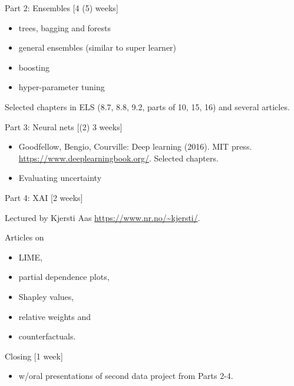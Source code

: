 \documentclass[
  ignorenonframetext,
]{beamer}
\providecommand{\tightlist}{%
  \setlength{\itemsep}{0pt}\setlength{\parskip}{0pt}}
\begin{document}
\begin{frame}

\begin{block}{Part 2: Ensembles {[}4 (5) weeks{]}}

\begin{itemize}
\tightlist
\item
  trees, bagging and forests
\item
  general ensembles (similar to super learner)
\item
  boosting
\item
  hyper-parameter tuning
\end{itemize}

Selected chapters in ELS (8.7, 8.8, 9.2, parts of 10, 15, 16) and
several articles.

\end{block}

\begin{block}{Part 3: Neural nets {[}(2) 3 weeks{]}}

\begin{itemize}
\tightlist
\item
  Goodfellow, Bengio, Courville: Deep learning (2016). MIT press.
  \url{https://www.deeplearningbook.org/}. Selected chapters.
\item
  Evaluating uncertainty
\end{itemize}

\end{block}

\end{frame}

\begin{frame}

\begin{block}{Part 4: XAI {[}2 weeks{]}}

Lectured by Kjersti Aas \url{https://www.nr.no/~kjersti/}.

Articles on

\begin{itemize}
\tightlist
\item
  LIME,
\item
  partial dependence plots,
\item
  Shapley values,
\item
  relative weights and
\item
  counterfactuals.
\end{itemize}

\end{block}

\begin{block}{Closing {[}1 week{]}}

\begin{itemize}
\tightlist
\item
  w/oral presentations of second data project from Parts 2-4.
\end{itemize}

\end{block}

\end{frame}
\end{document}
